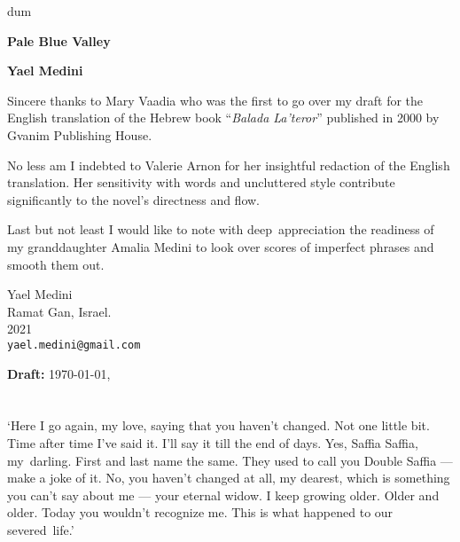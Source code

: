 \documentclass[twoside,11pt,openany]{book}
\begin{document}
\thispagestyle{empty}
{\nullfont dum}
\vspace{.02\textheight}
\begin{center}
{\Huge \textbf{Pale Blue Valley}}

\bigskip

\textbf{\Large Yael Medini}
\end{center}
\vspace{.1\textheight}

Sincere thanks to Mary Vaadia who was the first to go over my draft
for the English translation of the Hebrew book ``\emph{Balada La'teror}''
published in 2000 by Gvanim Publishing House.

\bigskip
No less am I indebted to Valerie Arnon for her insightful redaction of
the English translation. Her sensitivity with words and uncluttered
style contribute significantly to the novel's directness and flow.

\bigskip
Last but not least I would like to note with deep~appreciation the
readiness of my granddaughter Amalia Medini to look over scores of
imperfect phrases and smooth them out.


\bigskip
{
\parindent=0pt
Yael Medini\\
Ramat Gan, Israel. \\
2021 \\
\texttt{yael.medini@gmail.com}
}

\ifdefined\ymdhms
 \bigskip
 \textbf{Draft:}  \today, \currenttime
\fi

\chapter{}

`Here I go again,
my love,{ saying that you haven't changed. Not one little
bit}. {Time after time I've said it. I'll say it
till the end of days. Yes, Saffia Saffia, my~darling. First and last name the same. }They used to call you Double
Saffia --- make a joke of it.{ No,
you} {haven't
changed }at all, my dearest, which is something you can't say about
me --- your
eternal{ widow. I keep growing older. Older and older.
}Today{ you wouldn't recognize me. This is what happened to our
severed~life.'}
\end{document}
